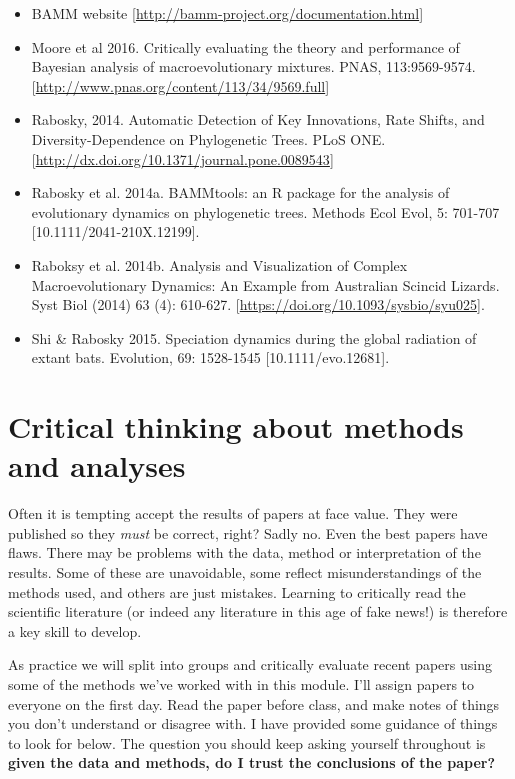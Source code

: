 \documentclass[]{book}
\providecommand{\tightlist}{%
  \setlength{\itemsep}{0pt}\setlength{\parskip}{0pt}}
\begin{document}
\begin{itemize}
\tightlist
\item
  BAMM website {[}\url{http://bamm-project.org/documentation.html}{]}
\item
  Moore et al 2016. Critically evaluating the theory and performance of
  Bayesian analysis of macroevolutionary mixtures. PNAS, 113:9569-9574.
  {[}\url{http://www.pnas.org/content/113/34/9569.full}{]}
\item
  Rabosky, 2014. Automatic Detection of Key Innovations, Rate Shifts,
  and Diversity-Dependence on Phylogenetic Trees. PLoS ONE.
  {[}\url{http://dx.doi.org/10.1371/journal.pone.0089543}{]}
\item
  Rabosky et al. 2014a. BAMMtools: an R package for the analysis of
  evolutionary dynamics on phylogenetic trees. Methods Ecol Evol, 5:
  701-707 {[}10.1111/2041-210X.12199{]}.
\item
  Raboksy et al. 2014b. Analysis and Visualization of Complex
  Macroevolutionary Dynamics: An Example from Australian Scincid
  Lizards. Syst Biol (2014) 63 (4): 610-627.
  {[}\url{https://doi.org/10.1093/sysbio/syu025}{]}.
\item
  Shi \& Rabosky 2015. Speciation dynamics during the global radiation
  of extant bats. Evolution, 69: 1528-1545 {[}10.1111/evo.12681{]}.
\end{itemize}

\chapter{Critical thinking about methods and
analyses}\label{critical-thinking-about-methods-and-analyses}

Often it is tempting accept the results of papers at face value. They
were published so they \emph{must} be correct, right? Sadly no. Even the
best papers have flaws. There may be problems with the data, method or
interpretation of the results. Some of these are unavoidable, some
reflect misunderstandings of the methods used, and others are just
mistakes. Learning to critically read the scientific literature (or
indeed any literature in this age of fake news!) is therefore a key
skill to develop.

As practice we will split into groups and critically evaluate recent
papers using some of the methods we've worked with in this module. I'll
assign papers to everyone on the first day. Read the paper before class,
and make notes of things you don't understand or disagree with. I have
provided some guidance of things to look for below. The question you
should keep asking yourself throughout is \textbf{given the data and
methods, do I trust the conclusions of the paper?}
\end{document}
